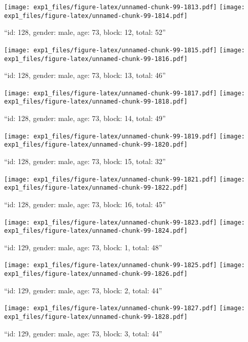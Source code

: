 \documentclass[,]{article}
\begin{document}
\texttt{[image: exp1\_files/figure-latex/unnamed-chunk-99-1813.pdf]}
\texttt{[image: exp1\_files/figure-latex/unnamed-chunk-99-1814.pdf]}

\newpage
[1] 

``id: 128, gender: male, age: 73, block: 12, total: 52''

\texttt{[image: exp1\_files/figure-latex/unnamed-chunk-99-1815.pdf]}
\texttt{[image: exp1\_files/figure-latex/unnamed-chunk-99-1816.pdf]}

\newpage
[1] 

``id: 128, gender: male, age: 73, block: 13, total: 46''

\texttt{[image: exp1\_files/figure-latex/unnamed-chunk-99-1817.pdf]}
\texttt{[image: exp1\_files/figure-latex/unnamed-chunk-99-1818.pdf]}

\newpage
[1] 

``id: 128, gender: male, age: 73, block: 14, total: 49''

\texttt{[image: exp1\_files/figure-latex/unnamed-chunk-99-1819.pdf]}
\texttt{[image: exp1\_files/figure-latex/unnamed-chunk-99-1820.pdf]}

\newpage
[1] 

``id: 128, gender: male, age: 73, block: 15, total: 32''

\texttt{[image: exp1\_files/figure-latex/unnamed-chunk-99-1821.pdf]}
\texttt{[image: exp1\_files/figure-latex/unnamed-chunk-99-1822.pdf]}

\newpage
[1] 

``id: 128, gender: male, age: 73, block: 16, total: 45''

\texttt{[image: exp1\_files/figure-latex/unnamed-chunk-99-1823.pdf]}
\texttt{[image: exp1\_files/figure-latex/unnamed-chunk-99-1824.pdf]}

\newpage
[1] 

``id: 129, gender: male, age: 73, block: 1, total: 48''

\texttt{[image: exp1\_files/figure-latex/unnamed-chunk-99-1825.pdf]}
\texttt{[image: exp1\_files/figure-latex/unnamed-chunk-99-1826.pdf]}

\newpage
[1] 

``id: 129, gender: male, age: 73, block: 2, total: 44''

\texttt{[image: exp1\_files/figure-latex/unnamed-chunk-99-1827.pdf]}
\texttt{[image: exp1\_files/figure-latex/unnamed-chunk-99-1828.pdf]}

\newpage
[1] 

``id: 129, gender: male, age: 73, block: 3, total: 44''
\end{document}
